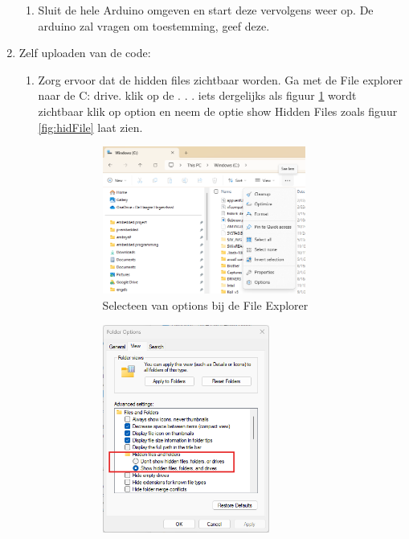 \begin{enumerate}
\begin{enumerate}
   \item  Sluit de hele Arduino omgeven en start deze vervolgens weer op. De arduino zal vragen om toestemming, geef deze.
  \end{enumerate}
   \item Zelf uploaden van de code:
      \begin{enumerate}
            \item Zorg ervoor dat de hidden files zichtbaar worden. Ga met de File explorer naar de C: drive. klik op de . . . iets dergelijks als figuur \ref{fig:winOp} wordt zichtbaar klik op option en neem de optie show Hidden Files zoals figuur \ref{fig:hidFile} laat zien. 
            \begin{figure}[h!]
            	\centering
             		\begin{subfigure}[b]{0.49\textwidth}
            			\includegraphics[width=0.85\textwidth]{figuren/VerkennerOptions}
            			\caption{Selecteen van options bij de File Explorer }
            			\label{fig:winOp}
            		\end{subfigure}
            		\begin{subfigure}[b]{0.49\textwidth}
            			\includegraphics[width=0.7\textwidth]{figuren/windowsHiddenFile}

\end{subfigure}
\end{figure}
\end{enumerate}
\end{enumerate}
